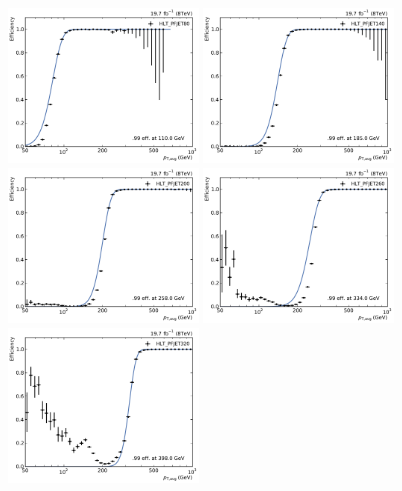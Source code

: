 \begin{figure}[htbp]
    \centering
    \includegraphics[width=0.45\textwidth]{figures/measurement/trigger_eff_HLT_PFJET80_default.pdf}\hfill
    \includegraphics[width=0.45\textwidth]{figures/measurement/trigger_eff_HLT_PFJET140_default.pdf}
    \includegraphics[width=0.45\textwidth]{figures/measurement/trigger_eff_HLT_PFJET200_default.pdf}\hfill
    \includegraphics[width=0.45\textwidth]{figures/measurement/trigger_eff_HLT_PFJET260_default.pdf}
    \includegraphics[width=0.45\textwidth]{figures/measurement/trigger_eff_HLT_PFJET320_default.pdf}\hfill

\end{figure}
